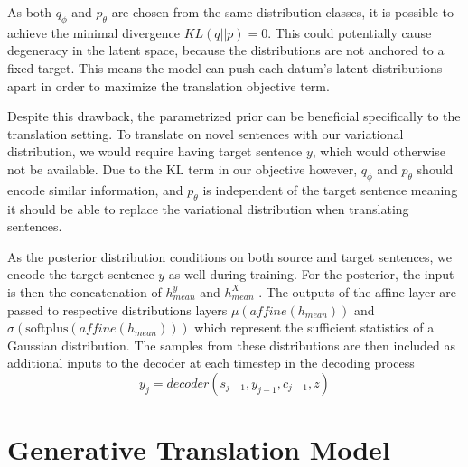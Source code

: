 As both $q_{\phi}$ and $p_{\theta}$ are chosen from the same distribution classes, it is possible to achieve the minimal divergence $KL(q || p) = 0$. This could potentially cause degeneracy in the latent space, because the distributions are not anchored to a fixed target. This means the model can push each datum's latent distributions apart in order to maximize the translation objective term. %

Despite this drawback, the parametrized prior can be beneficial specifically to the translation setting. To translate on novel sentences with our variational distribution, we would require having target sentence $y$, which would otherwise not be available. Due to the KL term in our objective however, $q_{\phi}$ and $p_{\theta}$ should encode similar information, and $p_{\theta}$ is independent of the target sentence meaning it should be able to replace the variational distribution when translating sentences. %

As the  posterior distribution conditions on both source and target sentences, we encode the target sentence $y$ as well during training. For the posterior, the input is then the concatenation of $h_{mean}^y$ and $h_{mean}^X$ . The outputs of the affine layer are passed to respective distributions layers $\mu(affine(h_{mean}))$ and $\sigma(\text{softplus} (affine(h_{mean})))$ which represent the sufficient statistics of a Gaussian distribution. The samples from these distributions are then included as additional inputs to the decoder at each timestep in the decoding process
\begin{equation}
y_{j} = decoder(s_{j-1}, y_{j-1}, c_{j-1}, z)
\end{equation}



\section{Generative Translation Model}

